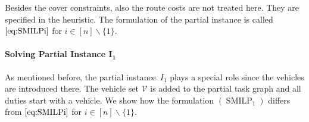Besides the cover constraints, also the route costs are not treated here. They are specified in the heuristic. The formulation of the partial instance is called $\eqref{eq:SMILPi}$ for ${i\in[n]\backslash\{1\}}$.

\paragraph{Solving Partial Instance $\boldsymbol{I_1}$} \parfill

As mentioned before, the partial instance~$I_1$ plays a special role since the vehicles are introduced there. The vehicle set $\mathcal{V}$ is added to the partial task graph and all duties start with a vehicle. We show how the formulation $(\operatorname{SMILP}_1)$ differs from $\eqref{eq:SMILPi}$ for ${i\in[n]\backslash\{1\}}$.

\newpage


